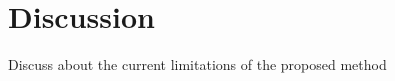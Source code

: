 

\section{Discussion}\label{sec:discussion}

Discuss about the current limitations of the proposed method